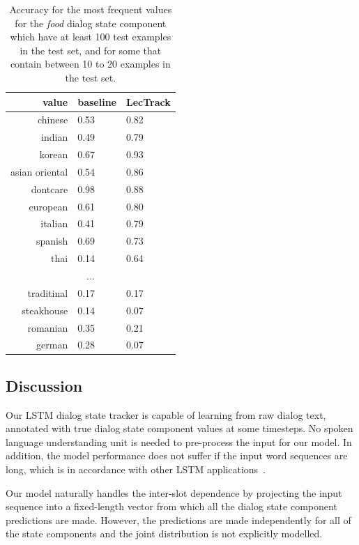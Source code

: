 \documentclass[runningheads,a4paper]{llncs}
\begin{document}
\begin{table}
    \centering
    \begin{tabular}{|r|ll|}
    \hline
               value & baseline & LecTrack \\
    \hline
             chinese   & 0.53   & 0.82   \\
              indian   & 0.49   & 0.79   \\
              korean   & 0.67   & 0.93   \\
      asian oriental   & 0.54   & 0.86   \\
            dontcare   & 0.98   & 0.88   \\
            european   & 0.61   & 0.80   \\
             italian   & 0.41   & 0.79   \\
             spanish   & 0.69   & 0.73   \\
                thai   & 0.14   & 0.64   \\
    \multicolumn{3}{|c|}{...} \\
                traditinal  & 0.17  & 0.17 \\
               steakhouse   & 0.14  & 0.07 \\
                romanian    & 0.35  & 0.21 \\
                german      & 0.28  & 0.07 \\
    \hline
    \end{tabular}

    \medskip
    \caption{Accuracy for the most frequent values for the \emph{food} dialog state component which have at least 100 test examples in the test set, and for some that contain between 10 to 20 examples in the test set.}
    \label{table:resultsFreq}
\end{table}

\subsection{Discussion}
\label{sec:discussion}
Our LSTM dialog state tracker is capable of learning from raw dialog text, annotated with true dialog state component values at some timesteps. No spoken language understanding unit is needed to pre-process the input for our model. In addition, the model performance does not suffer if the input word sequences are long, which is in accordance with other LSTM applications~\cite{sutskever2014sequence}.

Our model naturally handles the inter-slot dependence by projecting the input sequence into a fixed-length vector from which all the dialog state component predictions are made. However, the predictions are made independently for all of the state components and the joint distribution is not explicitly modelled.
\end{document}
